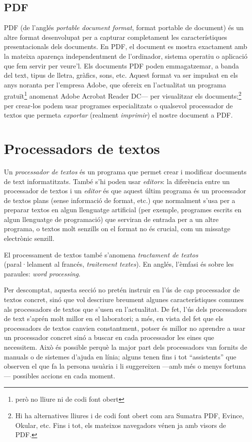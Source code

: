 \subsection{PDF}
PDF (de l'anglés \emph{portable document format}, format portable de
document) és un altre format desenvolupat per a capturar completament
les característiques presentacionals dels documents. En PDF, el
document es mostra exactament amb la mateixa aparença independentment
de l'ordinador, sistema operatiu o aplicació que fem servir per
veure'l. Els documents PDF poden emmagatzemar, a banda del text, tipus
de lletra, gràfics, sons, etc. Aquest format va ser impulsat en els
anys noranta per l'empresa Adobe, que ofereix en l'actualitat un
programa gratuït\footnote{però no lliure ni de codi font obert}
anomenat Adobe Acrobat Reader DC--- per visualitzar els
documents;\footnote{Hi ha alternatives lliures i de codi font obert
  com ara Sumatra PDF, Evince, Okular, etc. Fins i tot, els mateixos
  navegadors vénen ja amb visors de PDF.}  per crear-los podem usar
programes especialitzats o qualsevol processador de textos que permeta
\emph{exportar} (realment \emph{imprimir}) el nostre document a PDF.

\section{Processadors de textos}\label{ss:proctext}
Un \emph{processador de textos} és un programa que permet crear i
modificar documents de text informatitzats. També s'hi poden usar
\emph{editors}: la diferència entre un processador de textos i un
\emph{editor} és que aquest últim programa és un processador de textos
plans (sense informació de format, etc.) que normalment s'usa per a
preparar textos en algun llenguatge artificial (per exemple, programes
escrits en algun llenguatge de programació) que serviran de entrada
per a un altre programa, o textos molt senzills on el format no és
crucial, com un missatge electrònic senzill.

El processament de textos també s'anomena \emph{tractament de textos}
(paral·lelament al francés, \emph{traitement textes}). En anglés,
l'èmfasi és sobre les paraules: \emph{word processing}.

Per descomptat, aquesta secció no pretén instruir en l'ús de cap
processador de textos concret, sinó que vol descriure breument algunes
característiques comunes als processadors de textos que s'usen en
l'actualitat. De fet, l'ús dels processadors de text s'aprén molt
millor en el laboratori; a més, en vista del fet que els processadors
de textos canvien constantment, potser és millor no aprendre a usar un
processador concret sinó a buscar en cada processador les eines que
necessitem. Això és possible perquè la major part dels processadors
van fornits de manuals o de sistemes d'ajuda en línia; alguns tenen
fins i tot ``assistents'' que observen el que fa la persona usuària i
li suggereixen ---amb més o menys fortuna--- possibles accions en cada
moment.

